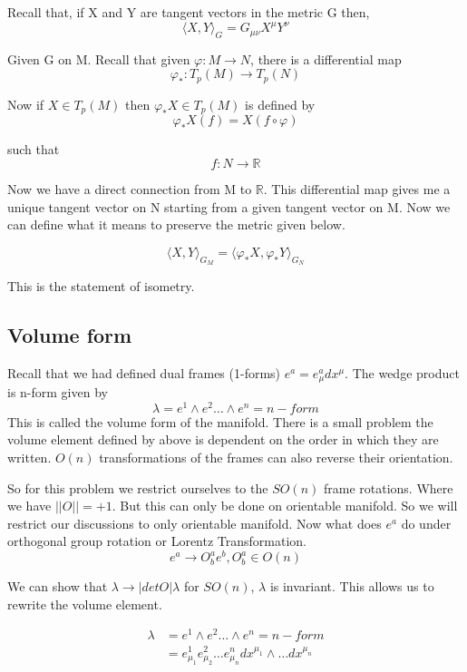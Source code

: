 \documentclass{article}
\begin{document}
Recall that, if X and Y are tangent vectors in the metric G then, 
\[ \langle X,Y \rangle_G = G_{\mu \nu} X^\mu Y^\nu \]

Given G on M. Recall that 
given \( \varphi: M \to N\), there is a differential map
\[ \varphi_{*}: T_p(M) \to T_p(N) \]

Now if \( X \in T_p(M)\) then \( \varphi_{*} X \in T_p(M) \) is defined by 
\[ \varphi_{*}X(f) = X(f \circ \varphi) \]

such that \[ f:N \to \mathbb{R} \]

Now we have a direct connection from M to \( \mathbb{R} \). This differential map gives me a unique tangent vector on N starting from a given tangent vector on M. Now we can define what it means to preserve the metric given below.  

\[ \langle X,Y \rangle_{G_M} = \langle \varphi_{*} X, \varphi_{*} Y \rangle_{G_N} \]

This is the statement of isometry. 

\subsection{Volume form}
Recall that we had defined dual frames (1-forms) \( e^a = e^a_\mu dx^\mu\). The wedge product is n-form given by 
\[ \lambda = e^1 \wedge e^2 \dots \wedge e^n = n-form \]
This is called the volume form of the manifold. There is a small problem the volume element defined by above is dependent on the order in which they are written. \( O(n) \) transformations of the frames can also reverse their orientation. 

So for this problem we restrict ourselves to the \( SO(n)\) frame rotations. Where we have \( || O || = +1\). But this can only be done on orientable manifold. So we will restrict our discussions to only orientable manifold.
Now what does \( e^a \) do under orthogonal group rotation or Lorentz Transformation. 
\[ e^a \to O^a_b e^b, O^a_b \in O(n) \]

We can show that \( \lambda \to |det O| \lambda \)
for \( SO(n)\), \( \lambda\) is invariant. This allows us to rewrite the volume element.

\begin{align*}
\lambda &= e^1 \wedge e^2 \dots \wedge e^n = n-form \\
        &= e^1_{\mu_1} e^2_{\mu_2} \dots e^n_{\mu_n} dx^{\mu_1} \wedge \dots dx^{\mu_n} \\
\end{align*}
\end{document}

